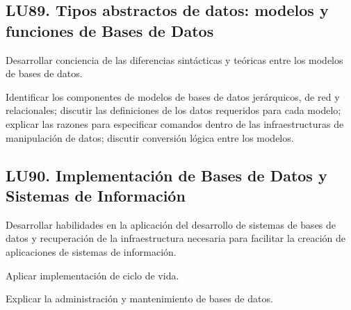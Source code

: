 \subsection{LU89. Tipos abstractos de datos: modelos y funciones de Bases de Datos}\label{sec:LU89}
\begin{LearningUnit}
\begin{LUGoal}
\item Desarrollar conciencia de las diferencias sintácticas y teóricas entre los modelos de bases de datos.
\end{LUGoal}

\begin{LUObjective}
\item Identificar los componentes de modelos de bases de datos jerárquicos, de red y relacionales; discutir las definiciones de los datos requeridos para cada modelo; explicar las razones para especificar comandos dentro de las infraestructuras de manipulación de datos; discutir conversión lógica entre los modelos.
\end{LUObjective}
\end{LearningUnit}

\subsection{LU90. Implementación de Bases de Datos y Sistemas de Información}\label{sec:LU90}
\begin{LearningUnit}
\begin{LUGoal}
\item Desarrollar habilidades en la aplicación del desarrollo de sistemas de bases de datos y recuperación de la infraestructura necesaria para facilitar la creación de aplicaciones de sistemas de información.
\end{LUGoal}

\begin{LUObjective}
\item Aplicar implementación de ciclo de vida.
\item Explicar la administración y mantenimiento de bases de datos.
\end{LUObjective}
\end{LearningUnit}

